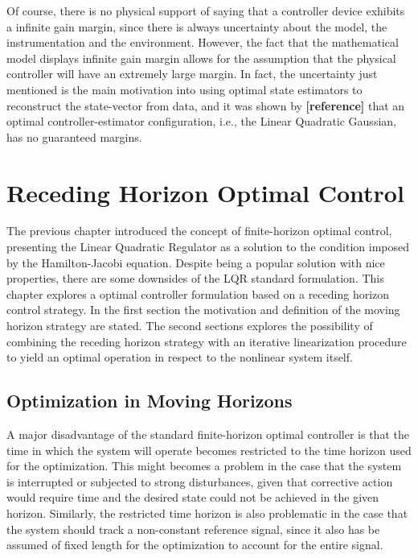 \documentclass[a4paper,11pt]{book}
\numberwithin{figure}{chapter}
\numberwithin{equation}{chapter}
\numberwithin{table}{chapter}
\theoremstyle{definition}
\begin{document}
Of course, there is no physical support of saying that a controller device exhibits a infinite gain margin, since there is always uncertainty about the model, the instrumentation and the environment. However, the fact that the mathematical model displays infinite gain margin allows for the assumption that the physical controller will have an extremely large margin. In fact, the uncertainty just mentioned is the main motivation into using optimal state estimators to reconstruct the state-vector from data, and it was shown by \textbf{[reference]} that an optimal controller-estimator configuration, i.e., the Linear Quadratic Gaussian, has no guaranteed margins.

\clearpage
\chapter{Receding Horizon Optimal Control}

The previous chapter introduced the concept of finite-horizon optimal control, presenting the Linear Quadratic Regulator as a solution to the condition imposed by the Hamilton-Jacobi equation. Despite being a popular solution with nice properties, there are some downsides of the LQR standard formulation. This chapter explores a optimal controller formulation based on a receding horizon control strategy. In the first section the motivation and definition of the moving horizon strategy are stated. The second sections explores the possibility of combining the receding horizon strategy with an iterative linearization procedure to yield an optimal operation in respect to the nonlinear system itself.

\section{Optimization in Moving Horizons}

A major disadvantage of the standard finite-horizon optimal controller is that the time in which the system will operate becomes restricted to the time horizon used for the optimization. This might becomes a problem in the case that the system is interrupted or subjected to strong disturbances, given that corrective action would require time and the desired state could not be achieved in the given horizon. Similarly, the restricted time horizon is also problematic in the case that the system should track a non-constant reference signal, since it also has be assumed of fixed length for the optimization to account for the entire signal. 
\end{document}
